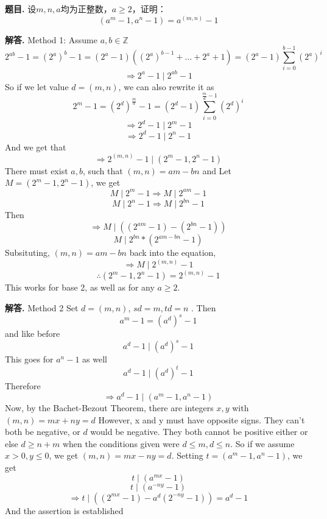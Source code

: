 \documentclass[12pt, a4paper, oneside]{article}
\newcounter{problemname}
\newenvironment{problem}{\begin{shaded}\stepcounter{problemname}\par\noindent\textbf{题目\arabic{problemname}. }}{\end{shaded}\par}
\newenvironment{solution}{\par\noindent\textbf{解答. }}{\par}
\begin{document}
\begin{CJK}{UTF8}{gbsn}
\begin{problem}
  设$m,n,a$均为正整数，$a\ge2$，证明：
  $$ \left( a^m-1,a^n-1 \right) = a^{(m,n)} - 1 $$
\end{problem}

\begin{solution}
  \newline
  Method 1:
  Assume $a,b \in\mathbb{Z}$
  $$ 2^{ab}-1=(2^a)^b-1 = (2^a -1)((2^a)^{b-1}+\dots+2^a +1)  = (2^a-1)\sum_{i=0}^{b-1}{(2^a)^i}$$
  $$ \Rightarrow 2^a - 1 \mid 2^{ab}-1 $$
  So if we let value $d = (m,n)$, we can also rewrite it as
  $$ 2^{m}-1=(2^d)^{\frac{m}{d}}-1 = (2^d -1) \sum_{i=0}^{\frac{m}{d}-1}{(2^d)^i}$$ 
  $$ \Rightarrow 2^{d}-1 \mid 2^m-1 $$
  $$ \Rightarrow 2^{d}-1 \mid 2^n-1 $$
  And we get that
  $$ \Rightarrow 2^{(m,n)}-1 \mid (2^m-1, 2^n-1) $$
  There must exist $a,b$, such that $  (m,n) = am - bn  $ and Let $ M = (2^m-1, 2^n-1)  $, we get 
  $$ M \mid 2^m-1 \Rightarrow M \mid 2^{am}-1 $$
  $$ M \mid 2^n-1 \Rightarrow M \mid 2^{bn} -1 $$ 
  Then
  $$ \Rightarrow M \mid ((2^{am} -1) -(2^{bn} -1)) $$ 
  $$ M \mid 2^{bn}*(2^{am-bn} -1) $$
  Subsituting, $(m,n)= am - bn$ back into the equation,
  $$ \Rightarrow M \mid 2^{(m,n)} - 1 $$
  $$ \therefore (2^m-1,2^n-1)=2^{(m,n)}-1 $$ 
  This works for base 2, as well as for any $a \geq 2$.  
\end{solution}

\begin{solution}
  \newline
  Method 2 \newline 
  Set $d = (m,n)$, $sd = m,td = n$ . Then 
  $$ a^m - 1 = (a^d)^s - 1 $$  
  and like before
  $$ a^d - 1 \mid (a^d)^s - 1 $$ 
  This goes for $a^n - 1$ as well
  $$ a^d - 1 \mid (a^d)^t - 1 $$ 
  Therefore 
  $$ \Rightarrow a^d - 1 \mid  (a^m-1,a^n-1) $$
  Now, by the Bachet-Bezout Theorem, there are integers $x,y$ with $(m,n) = mx+ny = d $ \newline
  However, x and y must have opposite signs. They can't both be negative, or $d$ would be negative. 
  They both cannot be positive either or else $ d \geq n + m $ when the conditions given were $ d \leq m, d \leq n $.
  So if we assume $ x > 0, y \leq 0 $, we get $(m,n) = mx-ny = d $.
  Setting $ t = (a^m-1, a^n-1)  $, we get 
  $$ t \mid (a^{mx} - 1) $$ 
  $$ t \mid (a^{-ny} - 1)$$ 
  $$ \Rightarrow t \mid ((2^{mx} - 1 )- a^d(2^{-ny} -1)) = a^d-1$$ 
  And the assertion is established

\end{solution}


\end{CJK}
\end{document}
